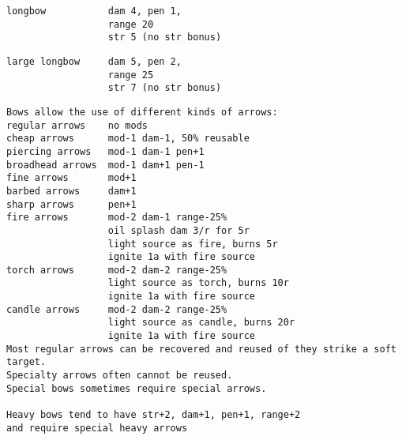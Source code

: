 \begin{samepage}
\begin{verbatim}
longbow           dam 4, pen 1,
                  range 20
                  str 5 (no str bonus)
\end{verbatim} \blocklistgap \begin{verbatim}
large longbow     dam 5, pen 2,
                  range 25
                  str 7 (no str bonus)
\end{verbatim} \blocklistgap \begin{verbatim}
Bows allow the use of different kinds of arrows:
regular arrows    no mods
cheap arrows      mod-1 dam-1, 50% reusable
piercing arrows   mod-1 dam-1 pen+1
broadhead arrows  mod-1 dam+1 pen-1
fine arrows       mod+1
barbed arrows     dam+1
sharp arrows      pen+1
fire arrows       mod-2 dam-1 range-25%
                  oil splash dam 3/r for 5r
                  light source as fire, burns 5r
                  ignite 1a with fire source
torch arrows      mod-2 dam-2 range-25%
                  light source as torch, burns 10r
                  ignite 1a with fire source
candle arrows     mod-2 dam-2 range-25%
                  light source as candle, burns 20r
                  ignite 1a with fire source
Most regular arrows can be recovered and reused of they strike a soft target.
Specialty arrows often cannot be reused.
Special bows sometimes require special arrows.

Heavy bows tend to have str+2, dam+1, pen+1, range+2
and require special heavy arrows
\end{verbatim} \end{samepage} \normalsize \goodbreak

\

